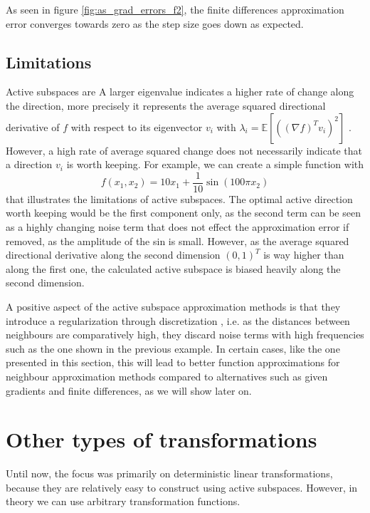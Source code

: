 \documentclass[
  a4paper,  %
  twoside,  %
  bibliography=totoc,
  headsepline,
  cleardoublepage=empty,
  parskip=half,
  draft=false
]{scrbook}
\begin{document}
As seen in figure \cref{fig:as_grad_errors_f2}, the finite differences approximation error converges towards zero as the step size goes down as expected.

\subsection{Limitations}

Active subspaces are
A larger eigenvalue indicates a higher rate of change along the direction, more precisely it represents the average squared directional derivative of $f$ with respect to its eigenvector $v_i$ with $\lambda_i=\mathds{E}[((\nabla f)^T v_i)^2]$ \cite{CG14}.
However, a high rate of average squared change does not necessarily indicate that a direction $v_i$ is worth keeping.
For example, we can create a simple function with
\begin{equation}
f(x_1, x_2)=10x_1 + \frac{1}{10} \sin(100 \pi x_2)
\end{equation}
that illustrates the limitations of active subspaces.
The optimal active direction worth keeping would be the first component only, as the second term can be seen as a highly changing noise term that does not effect the approximation error if removed, as the amplitude of the sin is small.
However, as the average squared directional derivative along the second dimension $(0,1)^T$ is way higher than along the first one, the calculated active subspace is biased heavily along the second dimension.

A positive aspect of the active subspace approximation methods is that they introduce a regularization through discretization \cite{}, i.e. as the distances between neighbours are comparatively high, they discard noise terms with high frequencies such as the one shown in the previous example.
In certain cases, like the one presented in this section, this will lead to better function approximations for neighbour approximation methods compared to alternatives such as given gradients and finite differences, as we will show later on.

\section{Other types of transformations}

Until now, the focus was primarily on deterministic linear transformations, because they are relatively easy to construct using active subspaces.
However, in theory we can use arbitrary transformation functions.
\end{document}
